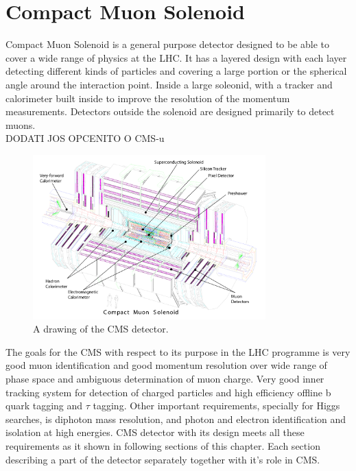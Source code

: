 \chapter{Compact Muon Solenoid} %

\label{Chapter4} %


Compact Muon Solenoid is a general purpose detector designed to be able to cover a wide range of physics at the LHC. It has a layered design with each layer detecting different kinds of particles and covering a large portion or the spherical angle around the interaction point. Inside a large soleonid, with a tracker and calorimeter built inside to improve the resolution of the momentum measurements. Detectors outside the solenoid are designed primarily to detect muons.  \\

DODATI JOS OPCENITO O CMS-u

\begin{figure}[htbp]
	\centering
		\includegraphics[width=0.8\textwidth]{Figures/CMS.pdf}
	\caption[CMS detector]{A drawing of the CMS detector. \cite{Chatrchyan:2008aa}}
	\label{fig:CMS}
\end{figure}
\par The goals for the CMS with respect to its purpose in the LHC programme is very good muon identification and good momentum resolution over wide range of phase space and ambiguous determination of muon charge. Very good inner tracking system for detection of charged particles and high efficiency offline b quark tagging and $\tau$ tagging. Other important requirements, specially for Higgs searches, is diphoton mass resolution, and photon and electron identification and isolation at high energies. 
CMS detector with its design meets all these requirements as it shown in following sections of this chapter.  Each section describing a part of the detector separately together with it's role in CMS.  

